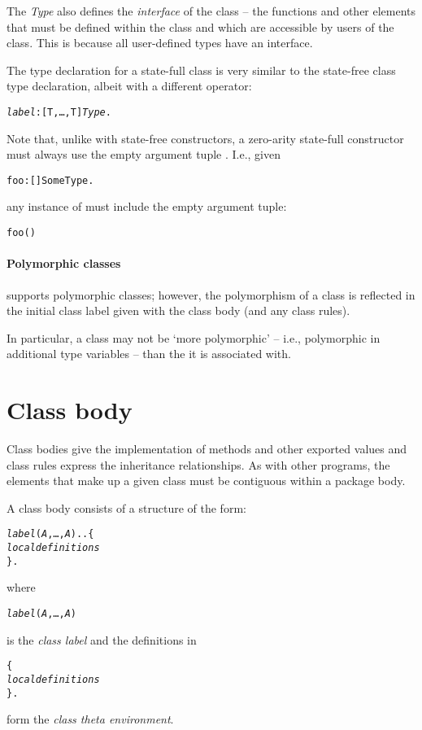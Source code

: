 The \emph{Type} also defines the \emph{interface} of the class -- the functions and other elements that must be defined within the class and which are accessible by users of the class. This is because all user-defined types have an interface.

The type declaration for a state-full class is very similar to the state-free class type declaration, albeit with a different operator:
\begin{alltt}
\emph{label}:[T,\ldots,T\subn] \sconarrow{} \emph{Type}.
\end{alltt}

Note that, unlike with state-free constructors, a zero-arity state-full constructor must always use the empty argument tuple \q{()}. I.e., given
\begin{alltt}
foo:[]\sconarrow{}SomeType.
\end{alltt}
any instance of  must include the empty argument tuple:
\begin{alltt}
foo()
\end{alltt}

\paragraph{Polymorphic classes}
\go supports polymorphic classes; however, the polymorphism of a class is reflected in the initial class label given with the class body (and any class rules).

In particular, a class may not be `more polymorphic' -- i.e., polymorphic in additional type variables -- than the  it is associated with.


\section{Class body}
\label{object:class body}
Class bodies give the implementation of methods and other exported values and class rules express the inheritance relationships. As with other programs, the elements that make up a given class must be contiguous within a package body.

A class body consists of a structure of the form:
\begin{alltt}
\emph{label}(\emph{A},\ldots,\emph{A\subn})..\{
  \emph{local definitions}
\}.
\end{alltt}
where
\begin{alltt}
\emph{label}(\emph{A},\ldots,\emph{A\subn})
\end{alltt}
is the \emph{class label} and the definitions in
\begin{alltt}
\{
  \emph{local definitions}
\}.
\end{alltt}
form the \emph{class theta environment}.

